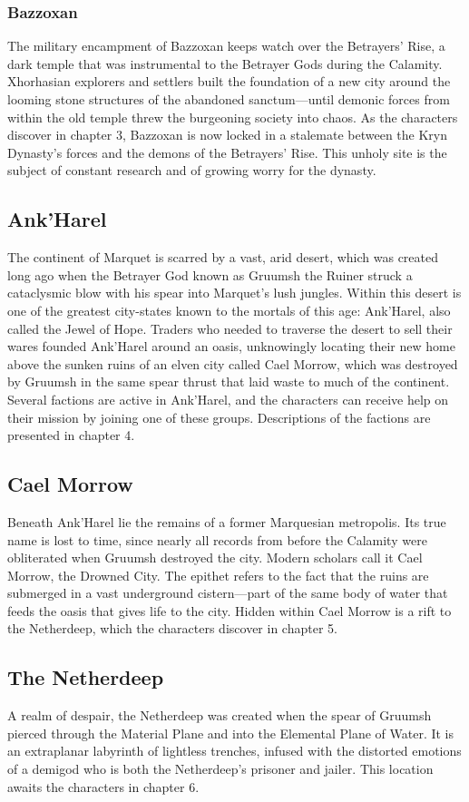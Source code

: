 \documentclass[10pt,a4,twoside,twocolumn,openany,nodeprecatedcode]{dndbook}
\begin{document}
\subsubsection{Bazzoxan}
The military encampment of Bazzoxan keeps watch over the Betrayers' Rise, a dark temple that was instrumental to the Betrayer Gods during the Calamity. Xhorhasian explorers and settlers built the foundation of a new city around the looming stone structures of the abandoned sanctum—until demonic forces from within the old temple threw the burgeoning society into chaos.
As the characters discover in chapter 3, Bazzoxan is now locked in a stalemate between the Kryn Dynasty's forces and the demons of the Betrayers' Rise. This unholy site is the subject of constant research and of growing worry for the dynasty.
\subsection{Ank'Harel}
The continent of Marquet is scarred by a vast, arid desert, which was created long ago when the Betrayer God known as Gruumsh the Ruiner struck a cataclysmic blow with his spear into Marquet's lush jungles. Within this desert is one of the greatest city-states known to the mortals of this age: Ank'Harel, also called the Jewel of Hope.
Traders who needed to traverse the desert to sell their wares founded Ank'Harel around an oasis, unknowingly locating their new home above the sunken ruins of an elven city called Cael Morrow, which was destroyed by Gruumsh in the same spear thrust that laid waste to much of the continent.
Several factions are active in Ank'Harel, and the characters can receive help on their mission by joining one of these groups. Descriptions of the factions are presented in chapter 4.
\subsection{Cael Morrow}
Beneath Ank'Harel lie the remains of a former Marquesian metropolis. Its true name is lost to time, since nearly all records from before the Calamity were obliterated when Gruumsh destroyed the city. Modern scholars call it Cael Morrow, the Drowned City. The epithet refers to the fact that the ruins are submerged in a vast underground cistern—part of the same body of water that feeds the oasis that gives life to the city.
Hidden within Cael Morrow is a rift to the Netherdeep, which the characters discover in chapter 5.
\subsection{The Netherdeep}
A realm of despair, the Netherdeep was created when the spear of Gruumsh pierced through the Material Plane and into the Elemental Plane of Water. It is an extraplanar labyrinth of lightless trenches, infused with the distorted emotions of a demigod who is both the Netherdeep's prisoner and jailer. This location awaits the characters in chapter 6.
\end{document}
